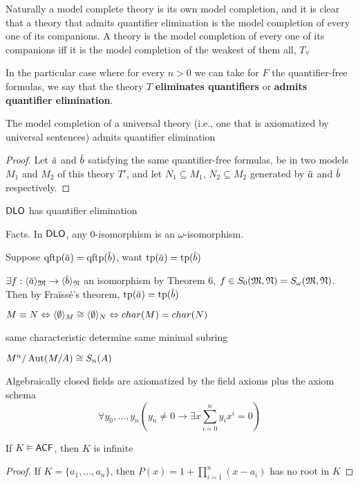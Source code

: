 \documentclass[11pt]{article}
\begin{document}
Naturally a model complete theory is its own model completion, and it is clear that a theory
that admits quantifier elimination is the model completion of every one of its companions. A
theory is the model completion of every one of its companions iff it is the model completion of
the weakest of them all, \(T_\forall\)

In the particular case where for every \(n>0\) we can take for \(F\) the quantifier-free
formulas, we say that the theory \(T\) \textbf{eliminates quantifiers} or \textbf{admits quantifier elimination}.

\begin{theorem}[]
The model completion of a universal theory (i.e., one that is axiomatized by universal
sentences) admits quantifier elimination
\end{theorem}

\begin{proof}
Let \(\bara\) and \(\barb\) satisfying the same quantifier-free formulas, be in two
models \(M_1\) and \(M_2\) of this theory \(T'\), and let \(N_1\subseteq M_1\), \(N_2\subseteq M_2\) generated
by \(\bara\) and \(\barb\) respectively.
\end{proof}



\(\operatorname{\textsf{DLO}}\) has quantifier elimination

Facts. In \(\operatorname{\textsf{DLO}}\), any 0-isomorphism is an \(\omega\)-isomorphism.

Suppose \(\qftp(\bara)=\qftp(\barb)\), want \(\tp(\bara)=\tp(\barb)\)

\(\exists f:\la\bara\ra_{\fM}\to\la\barb\ra_{\fN}\) an isomorphism by Theorem 6, \(f\in S_0(\mathfrak{M},\mathfrak{N})=S_\omega(\mathfrak{M},\mathfrak{N})\). Then by Fraïssé's
theorem, \(\tp(\bara)=\tp(\barb)\)

\(M\equiv N\Leftrightarrow\langle\emptyset\rangle_M\cong\langle\emptyset\rangle_N\Leftrightarrow char(M)=char(N)\)

same characteristic determine same minimal subring

\(M^n/\operatorname{\text{Aut}}(M/A)\cong S_n(A)\)

Algebraically closed fields are axiomatized by the field axioms plus the axiom schema
\begin{equation*}
\forall y_0,\dots,y_n\left( y_n\neq 0\to\exists x\sum_{i=0}^ny_ix^i=0 \right)
\end{equation*}
\begin{lemma}[]
If \(K\vDash\textsf{ACF}\), then \(K\) is infinite
\end{lemma}

\begin{proof}
If \(K=\{a_1,\dots,a_n\}\), then \(P(x)=1+\prod_{i=1}^n(x-a_i)\) has no root in \(K\)
\end{proof}
\end{document}
